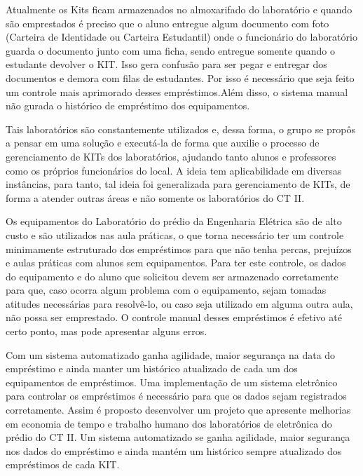 \vspace{-42pt}
Atualmente os Kits ficam armazenados no almoxarifado do laboratório e quando são emprestados é preciso que o aluno entregue algum documento com foto (Carteira de Identidade ou Carteira Estudantil) onde o funcionário do laboratório guarda o documento junto com uma ficha, sendo entregue somente quando o estudante devolver o KIT. Isso gera confusão para ser pegar e entregar dos documentos e demora com filas de estudantes. Por isso é necessário que seja feito um controle mais aprimorado desses empréstimos.Além disso, o sistema manual não gurada o histórico de empréstimo dos equipamentos.

Tais laboratórios são constantemente utilizados e, dessa forma, o grupo se propôs a pensar em uma solução e executá-la de forma que auxilie o processo de gerenciamento de KITs dos laboratórios, ajudando tanto alunos e professores como os próprios funcionários do local. A ideia tem aplicabilidade em diversas instâncias, para tanto, tal ideia foi generalizada para gerenciamento de KITs, de forma a atender outras áreas e não somente os laboratórios do CT II. 


Os equipamentos do Laboratório do prédio da Engenharia Elétrica são de alto custo e são utilizados nas aula práticas, o que torna necessário ter um controle minimamente estruturado dos empréstimos para que não tenha percas, prejuízos e aulas práticas com alunos sem equipamentos. Para ter este controle, os dados do equipamento e do aluno que solicitou devem ser armazenado corretamente para que, caso ocorra algum problema com o equipamento, sejam tomadas atitudes necessárias para resolvê-lo, ou caso seja utilizado em alguma outra aula, não possa ser emprestado. O controle manual desses empréstimos é efetivo até certo ponto, mas pode apresentar alguns erros.

Com um sistema automatizado ganha agilidade, maior segurança na data do empréstimo e ainda manter um histórico atualizado de cada um dos equipamentos de empréstimos. Uma implementação de um sistema eletrônico para controlar os empréstimos é necessário para que os dados sejam registrados corretamente. Assim é proposto desenvolver um projeto que apresente melhorias em economia de tempo e trabalho humano dos laboratórios de eletrônica do prédio do CT II. Um sistema automatizado se ganha agilidade, maior segurança nos dados do empréstimo e ainda mantém um histórico sempre atualizado dos empréstimos de cada KIT.

